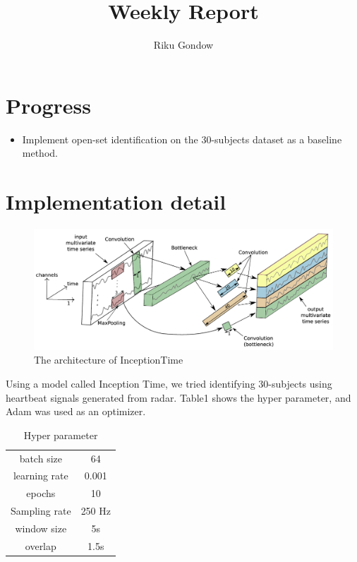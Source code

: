 \documentclass[dvipdfmx]{article}
\begin{document}
\title{Weekly Report}
\author{Riku Gondow}
\maketitle
\section{Progress}
\begin{itemize}
    \item Implement open-set identification on the 30-subjects dataset\cite{dataset} as a baseline method.
\end{itemize}

\section{Implementation detail}

\begin{figure}[H]
    \begin{center}
    \includegraphics[width=0.8\linewidth]{./img/Incep.png}
    \end{center}
    \caption{The architecture of InceptionTime}
\end{figure}
    
Using a model called Inception Time\cite{Inception}, we tried identifying 30-subjects using heartbeat signals generated from radar. Table1 shows the hyper parameter, and Adam was used as an optimizer.


\begin{table}[H]
    \caption{Hyper parameter}
    \centering
    \begin{tabular}{cc}
    \hline
    batch size & 64 \\
    learning rate & 0.001 \\
    epochs & 10 \\
    Sampling rate & 250 Hz \\
    window size & 5s \\
    overlap & 1.5s \\
    \hline
    \end{tabular}
\end{table}
\end{document}
